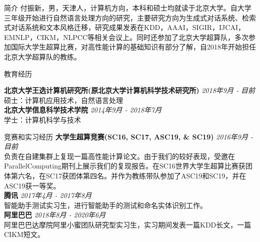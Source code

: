 \documentclass{resume} %
\begin{document}

\begin{rSection}{简介}
    付振新，男，天津人，计算机方向，本科和硕士均就读于北京大学。自大学三年级开始进行自然语言处理方向的研究，主要研究方向为生成式对话系统、检索式对话系统和文本风格迁移，研究成果发表在KDD，AAAI，SIGIR，IJCAI，EMNLP，CIKM，NLPCC等相关会议上。同时还参加了北京大学超算队，多次参加国际大学生超算比赛，对高性能计算的基础知识有部分了解，自2018年开始担任北京大学超算队的教练。
\end{rSection}

\begin{rSection}{教育经历}

    {\bf 北京大学王选计算机研究所(原北京大学计算机科学技术研究所)} \hfill {\em 2018年9月 - 目前} 
    \\ 硕士：计算机应用技术，自然语言处理 \\
    {\bf 北京大学信息科学技术学院} \hfill {\em 2014年9月 - 2018年7月}
    \\ 学士：计算机科学与技术
\end{rSection}
    

\begin{rSection}{竞赛和实习经历}
    \textbf{大学生超算竞赛(SC16, SC17, ASC19, \& SC19)} \hfill {\em 2016年9月 - 目前}\\
    负责在自建集群上复现一篇高性能计算论文。由于我们的较好表现，受邀在ParallelComputing期刊上展示我们的复现报告。在SC16世界大学生超算比赛获团体第六名，在SC17获团体第四名。并作为教练带队参加了ASC19和SC19，并在ASC19获一等奖。 \\
    \textbf{腾讯} \hfill {\em 2017年4月 - 2017年8月} \\
    智能助手测试实习生，进行智能助手的测试和命名实体识别工作。\\
    \textbf{阿里巴巴} \hfill {\em 2018年8月 - 2020年6月}\\
    阿里巴巴达摩院阿里小蜜团队研究型实习生，实习期间发表一篇KDD长文，一篇CIKM短文。
\end{rSection}
\end{document}
